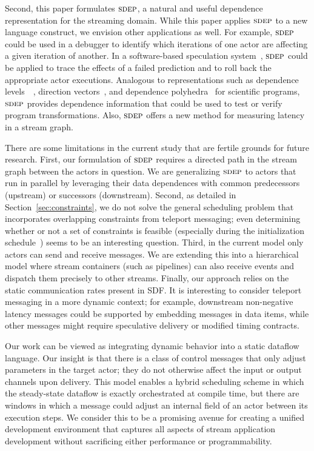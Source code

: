 \documentclass{sig-alternate}
\begin{document}

Second, this paper formulates $\textsc{sdep}$, a natural and useful dependence
representation for the streaming domain.  While this paper applies
$\textsc{sdep}$ to a new language construct, we envision other applications as
well.  For example, $\textsc{sdep}$ could be used in a debugger to identify
which iterations of one actor are affecting a given iteration of
another.  In a software-based speculation system~\cite{frank-thesis},
$\textsc{sdep}$ could be applied to trace the effects of a failed prediction
and to roll back the appropriate actor executions.  Analogous to
representations such as dependence levels~~\cite{AK82}, direction
vectors~\cite{wolfe82}, and dependence polyhedra~\cite{Irig88} for
scientific programs, $\textsc{sdep}$ provides dependence information that
could be used to test or verify program transformations.  Also,
$\textsc{sdep}$ offers a new method for measuring latency in a stream graph.

There are some limitations in the current study that are fertile
grounds for future research.  First, our formulation of $\textsc{sdep}$
requires a directed path in the stream graph between the actors in
question.  We are generalizing $\textsc{sdep}$ to actors that run in parallel
by leveraging their data dependences with common predecessors
(upstream) or successors (downstream).  Second, as detailed in
Section~\ref{sec:constraints}, we do not solve the general scheduling
problem that incorporates overlapping constraints from teleport
messaging; even determining whether or not a set of constraints is
feasible (especially during the initialization
schedule~\cite{karczma-thesis}) seems to be an interesting question.
Third, in the current model only actors can send and receive messages.
We are extending this into a hierarchical model where stream
containers (such as pipelines) can also receive events and dispatch
them precisely to other streams.  Finally, our approach relies on the
static communication rates present in SDF.  It is interesting to
consider teleport messaging in a more dynamic context; for example,
downstream non-negative latency messages could be supported by
embedding messages in data items, while other messages might require
speculative delivery or modified timing contracts.

Our work can be viewed as integrating dynamic behavior into a static
dataflow language.  Our insight is that there is a class of control
messages that only adjust parameters in the target actor; they do not
otherwise affect the input or output channels upon delivery.  This
model enables a hybrid scheduling scheme in which the steady-state
dataflow is exactly orchestrated at compile time, but there are
windows in which a message could adjust an internal field of an actor
between its execution steps.  We consider this to be a promising
avenue for creating a unified development environment that captures
all aspects of stream application development without sacrificing
either performance or programmability.
\end{document}
